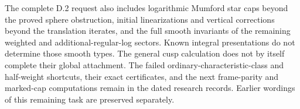The complete D.2 request also includes logarithmic Mumford star
caps beyond the proved sphere obstruction, initial linearizations
and vertical corrections beyond the translation iterates, and
the full smooth invariants of the remaining weighted and
additional-regular-log sectors. Known integral presentations do
not determine those smooth types. The general cusp calculation
does not by itself complete their global attachment. The failed
ordinary-characteristic-class and half-weight shortcuts, their
exact certificates, and the next frame-parity and marked-cap
computations remain in the dated research records. Earlier
wordings of this remaining task are preserved separately.

